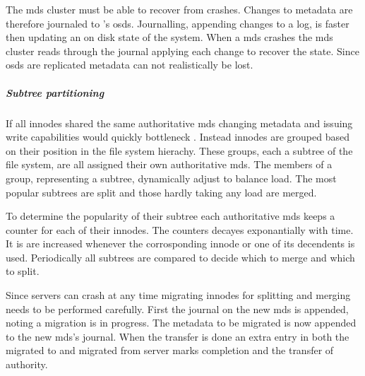 The \ac{mds} cluster must be able to recover from crashes. Changes to metadata are therefore journaled to \ceph{}'s \acfp{osd}. Journalling, appending changes to a log, is faster then updating an on disk state of the system. When a \ac{mds} crashes the \ac{mds} cluster reads through the journal applying each change to recover the state. Since \acp{osd} are replicated metadata can not realistically be lost.
%
\subparagraph{Subtree partitioning} \label{sec:subtree}
If all innodes shared the same authoritative \ac{mds} changing metadata and issuing write capabilities would quickly bottleneck \ceph{}. Instead innodes are grouped based on their position in the file system hierachy. These groups, each a subtree of the file system, are all assigned their own authoritative \ac{mds}. The members of a group, representing a subtree, dynamically adjust to balance load. The most popular subtrees are split and those hardly taking any load are merged.

To determine the popularity of their subtree each authoritative \ac{mds} keeps a counter for each of their innodes. The counters decayes exponantially with time. It is are increased whenever the corrosponding innode or one of its decendents is used. Periodically all subtrees are compared to decide which to merge and which to split.

Since servers can crash at any time migrating innodes for splitting and merging needs to be performed carefully. First the journal on the new \ac{mds} is appended, noting a migration is in progress. The metadata to be migrated is now appended to the new \ac{mds}'s journal. When the transfer is done an extra entry in both the migrated to and migrated from server marks completion and the transfer of authority. 
